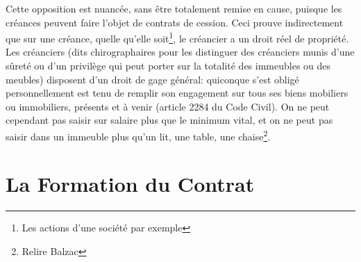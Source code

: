 \documentclass[math]{cours}
\begin{document}
Cette opposition est nuancée, sans être totalement remise en cause, puisque les créances peuvent faire l'objet de contrats de cession.
Ceci prouve indirectement que sur une créance, quelle qu'elle soit\footnote{Les actions d'une société par exemple}, le créancier a un droit réel de propriété.
Les créanciers (dits chirographaires pour les distinguer des créanciers munis d'une sûreté ou d'un privilège qui peut porter sur la totalité des immeubles ou des meubles) disposent d'un droit de gage général: quiconque s'est obligé personnellement est tenu de remplir son engagement sur tous ses biens mobiliers ou immobiliers, présents et à venir (article 2284 du Code Civil).
On ne peut cependant pas saisir sur salaire plus que le minimum vital, et on ne peut pas saisir dans un immeuble plus qu'un lit, une table, une chaise\footnote{Relire Balzac}.

\section{La Formation du Contrat}
\end{document}
